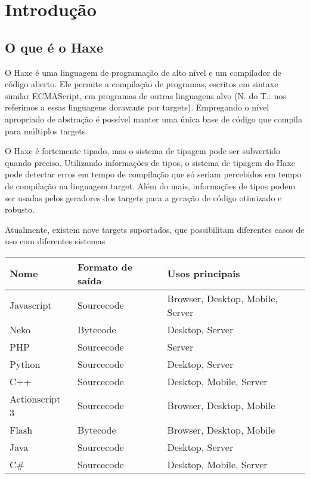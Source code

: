 \chapter{Introdução}
\label{introduction}

\section{O que é o Haxe}
\label{introduction-what-is-haxe}

O Haxe é uma linguagem de programação de alto nível e um compilador de código aberto. Ele permite a compilação de programas, escritos em sintaxe similar ECMAScript, em programas de outras linguagens alvo (N. do T.:  nos referimos a essas linguagens doravante por targets). Empregando o nível apropriado de abstração é possível manter uma única base de código que compila para múltiplos targets.

O Haxe é fortemente tipado, mas o sistema de tipagem pode ser subvertido quando preciso. Utilizando informações de tipos, o sistema de tipagem do Haxe pode detectar erros em tempo de compilação que só seriam percebidos em tempo de compilação na linguagem target. Além do mais, informações de tipos podem ser usadas pelos geradores dos targets para a geração de código otimizado e robusto.

Atualmente, existem nove targets suportados, que possibilitam diferentes casos de uso com diferentes sistemas 

\begin{center}
\begin{tabular}{| l | l | l |}
	\hline
	Nome & Formato de saída & Usos principais \\ \hline
	Javascript & Sourcecode & Browser, Desktop, Mobile, Server \\
	Neko & Bytecode & Desktop, Server \\
	PHP & Sourcecode & Server \\
	Python & Sourcecode & Desktop, Server \\
	C++ & Sourcecode & Desktop, Mobile, Server \\
	Actionscript 3 & Sourcecode & Browser, Desktop, Mobile \\
	Flash & Bytecode & Browser, Desktop, Mobile \\ 
	Java & Sourcecode & Desktop, Server \\
	C\# & Sourcecode & Desktop, Mobile, Server \\ \hline
\end{tabular}
\end{center}

